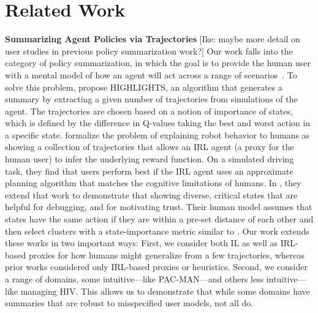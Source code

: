 \documentclass{article}
\begin{document}


\section{Related Work}



\textbf{Summarizing Agent Policies via Trajectories} [Ike: maybe more detail on user studies in previous policy summarization work?]
Our work falls into the category of policy summarization, in which the goal is to provide the human user with a mental model of how an agent will act across a range of scenarios~\cite{amir2018agent}. To solve this problem, \cite{amir2018highlights} propose HIGHLIGHTS, an algorithm that generates a summary by extracting a given number of trajectories from simulations of the agent. The trajectories are chosen based on a notion of importance of states, which is defined by the difference in Q-values taking the best and worst action in a specific state. \cite{huang17communicate} formalize the problem of explaining robot behavior to humans as showing a collection of trajectories that allows an IRL agent (a proxy for the human user) to infer the underlying reward function. On a simulated driving task, they find that users perform best if the IRL agent uses an approximate planning algorithm that matches the cognitive limitations of humans. In \cite{huang2018establishing}, they extend that work to demonstrate that showing diverse, critical states that are helpful for debugging, and for motivating trust. Their human model assumes that states have the same action if they are within a pre-set distance of each other and then select clusters with a state-importance metric similar to \cite{amir2018highlights}. Our work extends these works in two important ways: First, we consider both IL as well as IRL-based proxies for how humans might generalize from a few trajectories, whereas prior works considered only IRL-based proxies or heuristics. Second, we consider a range of domains, some intuitive---like PAC-MAN---and others less intuitive---like managing HIV. This allows us to demonstrate that while some domains have summaries that are robust to misspecified user models, not all do.
\end{document}
